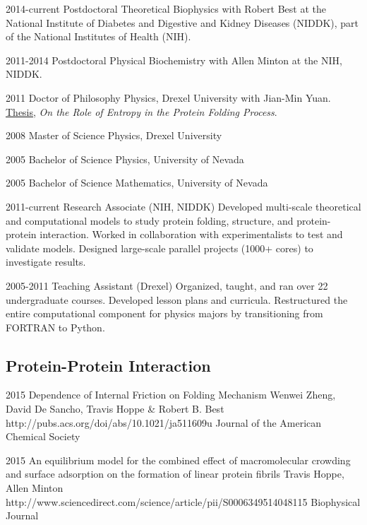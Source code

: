 \documentclass[]{scrartcl}
\begin{document}
\begin{cleanCV}


\WorkExperience
{2014-current}
{Postdoctoral}
{
Theoretical Biophysics with Robert Best at the
National Institute of Diabetes and Digestive and Kidney Diseases (NIDDK), 
part of the National Institutes of Health (NIH).
}

\WorkExperience
{2011-2014}
{Postdoctoral}
{
Physical Biochemistry with Allen Minton at the NIH, NIDDK.
}


\WorkExperience
{2011}
{Doctor of Philosophy}
{
Physics, Drexel University with Jian-Min Yuan. 
\href{https://idea.library.drexel.edu/islandora/object/idea:3488}{Thesis},
\emph{On the Role of Entropy in the Protein Folding Process}.
}

\WorkExperience
{2008}
{Master of Science}
{Physics, Drexel University}

\WorkExperience
{2005}
{Bachelor of Science}
{Physics, University of Nevada}

\WorkExperience
{2005}
{Bachelor of Science}
{Mathematics, University of Nevada}



\WorkExperience
{2011-current}
{Research Associate (NIH, NIDDK)}
{%
  Developed multi-scale theoretical and computational models to study protein folding, structure, and protein-protein interaction.
Worked in collaboration with experimentalists to test and validate models. 
Designed large-scale parallel projects (1000+ cores) to investigate results. 
}

\WorkExperience
{2005-2011}
{Teaching Assistant (Drexel)}
{%
  Organized, taught, and ran over 22 undergraduate courses.
  Developed lesson plans and curricula.
  Restructured the entire computational component for physics majors by transitioning from FORTRAN to Python.
}


\subsection{Protein-Protein Interaction}

\Paper
{2015}
{Dependence of Internal Friction on Folding Mechanism}
{Wenwei Zheng, David De Sancho, Travis Hoppe \& Robert B. Best}
{http://pubs.acs.org/doi/abs/10.1021/ja511609u}
{Journal of the American Chemical Society}

\Paper
{2015}
{An equilibrium model for the combined effect of macromolecular crowding and surface adsorption on the formation of linear protein fibrils}
{Travis Hoppe, Allen Minton}
{http://www.sciencedirect.com/science/article/pii/S0006349514048115}
{Biophysical Journal}


\end{cleanCV}
\end{document}
